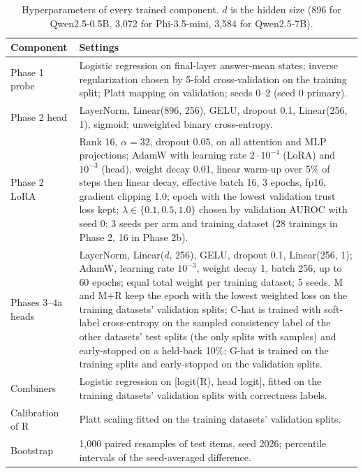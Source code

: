 \documentclass[10pt]{article}
\begin{document}
\begin{table}[h]
\centering
\small
\begin{tabular}{@{}p{3.2cm}p{11.3cm}@{}}
\toprule
Component & Settings \\
\midrule
Phase 1 probe & Logistic regression on final-layer answer-mean states; inverse regularization chosen by 5-fold cross-validation on the training split; Platt mapping on validation; seeds 0--2 (seed 0 primary). \\
Phase 2 head & LayerNorm, Linear(896, 256), GELU, dropout 0.1, Linear(256, 1), sigmoid; unweighted binary cross-entropy. \\
Phase 2 LoRA & Rank 16, $\alpha = 32$, dropout 0.05, on all attention and MLP projections; AdamW with learning rate $2\cdot10^{-4}$ (LoRA) and $10^{-3}$ (head), weight decay 0.01, linear warm-up over 5\% of steps then linear decay, effective batch 16, 3 epochs, fp16, gradient clipping 1.0; epoch with the lowest validation trust loss kept; $\lambda \in \{0.1, 0.5, 1.0\}$ chosen by validation AUROC with seed 0; 3 seeds per arm and training dataset (28 trainings in Phase 2, 16 in Phase 2b). \\
Phases 3--4a heads & LayerNorm, Linear($d$, 256), GELU, dropout 0.1, Linear(256, 1); AdamW, learning rate $10^{-3}$, weight decay 1, batch 256, up to 60 epochs; equal total weight per training dataset; 5 seeds. M and M+R keep the epoch with the lowest weighted loss on the training datasets' validation splits; C-hat is trained with soft-label cross-entropy on the sampled consistency label of the other datasets' test splits (the only splits with samples) and early-stopped on a held-back 10\%; G-hat is trained on the training splits and early-stopped on the validation splits. \\
Combiners & Logistic regression on [logit(R), head logit], fitted on the training datasets' validation splits with correctness labels. \\
Calibration of R & Platt scaling fitted on the training datasets' validation splits. \\
Bootstrap & 1,000 paired resamples of test items, seed 2026; percentile intervals of the seed-averaged difference. \\
\bottomrule
\end{tabular}
\caption{Hyperparameters of every trained component. $d$ is the hidden size (896 for Qwen2.5-0.5B, 3,072 for Phi-3.5-mini, 3,584 for Qwen2.5-7B).}
\label{tab:hparams}
\end{table}
\end{document}
